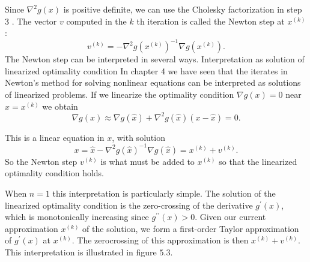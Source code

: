 Since $ \nabla^{2} g(x) $ is positive definite, we can use the Cholesky factorization in step 3 . The vector $ v $ computed in the $ k $ th iteration is called the Newton step at $ x^{(k)} $ :
\begin{equation}
v^{(k)}=-\nabla^{2} g\left(x^{(k)}\right)^{-1} \nabla g\left(x^{(k)}\right) .
\end{equation}
The Newton step can be interpreted in several ways.
Interpretation as solution of linearized optimality condition In chapter 4 we have seen that the iterates in Newton's method for solving nonlinear equations can be interpreted as solutions of linearized problems.
If we linearize the optimality condition $ \nabla g(x)=0 $ near $ \hat{x}=x^{(k)} $ we obtain
\begin{equation}
\nabla g(x) \approx \nabla g(\hat{x})+\nabla^{2} g(\hat{x})(x-\hat{x})=0 .
\end{equation}

This is a linear equation in $ x $, with solution
\begin{equation}
x=\hat{x}-\nabla^{2} g(\hat{x})^{-1} \nabla g(\hat{x})=x^{(k)}+v^{(k)} .
\end{equation}
So the Newton step $ v^{(k)} $ is what must be added to $ x^{(k)} $ so that the linearized optimality condition holds.

When $ n=1 $ this interpretation is particularly simple. The solution of the linearized optimality condition is the zero-crossing of the derivative $ g^{\prime}(x) $, which is monotonically increasing since $ g^{\prime \prime}(x)>0 $. Given our current approximation $ x^{(k)} $ of the solution, we form a first-order Taylor approximation of $ g^{\prime}(x) $ at $ x^{(k)} . $ The zerocrossing of this approximation is then $ x^{(k)}+v^{(k)} $. This interpretation is illustrated in figure $ 5.3 $.